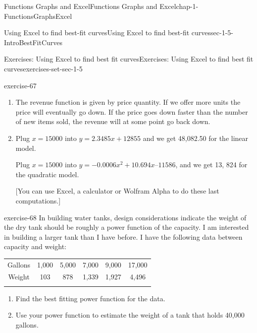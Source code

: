 \documentclass[oneside,10pt,]{book}
\numberwithin{equation}{section}
\newcommand{\hrulethin}  {\noalign{\hrule height 0.04em}}
\newcommand{\hrulemedium}{\noalign{\hrule height 0.07em}}
\newcommand{\hrulethick} {\noalign{\hrule height 0.11em}}
\begin{document}
\begin{chapterptx}{Functions Graphs and Excel}{}{Functions Graphs and Excel}{}{}{chap-1-FunctionsGraphsExcel}
\begin{sectionptx}{Using Excel to find best-fit curves}{}{Using Excel to find best-fit curves}{}{}{sec-1-5-IntroBestFitCurves}
\begin{exercises-subsection-numberless}{Exercises: Using Excel to find best fit curves}{}{Exercises: Using Excel to find best fit curves}{}{}{exercises-set-sec-1-5}
\begin{divisionexercise}{3}{}{}{exercise-67}
\begin{enumerate}[label=(\alph*)]
\par
\hypertarget{p-425}{}%
The quadratic (polynomial of degree 2) model is \(y = -0.0006x^2 + 10.694x – 11586\)%
\par
\hypertarget{p-426}{}%
The graphs show that the quadratic equation is the better model and follows the data more closely.%
\item\hypertarget{li-123}{}\hypertarget{p-427}{}%
The revenue function is given by price \textasteriskcentered{} quantity. If we offer more units the price will eventually go down. If the price goes down faster than the number of new items sold, the revenue will at some point go back down.%
\item\hypertarget{li-124}{}\hypertarget{p-428}{}%
Plug \(x = 15000\) into \(y = 2.3485x + 12855\) and we get \textdollar{}48,082.50 for the linear model.%
\par
\hypertarget{p-429}{}%
Plug \(x = 15000\) into \(y =-0.0006x^2 + 10.694x – 11586\), and we get \textdollar{}13, 824 for the quadratic model.%
\par
\hypertarget{p-430}{}%
[You can use Excel, a calculator or Wolfram Alpha to do these last computations.]%
\end{enumerate}
\end{divisionexercise}%
\begin{divisionexercise}{4}{}{}{exercise-68}%
\hypertarget{p-431}{}%
In building water tanks, design considerations indicate the weight of the dry tank should be roughly a power function of the capacity.  I am interested in building a larger tank than I have before. I have the following data between capacity and weight:%
\begin{sidebyside}{1}{0}{0}{0}%
\begin{sbspanel}{1}%
{\centering%
\begin{tabular}{cccccc}\hrulethick
Gallons&1,000&5,000&7,000&9,000&17,000\tabularnewline\hrulethin
Weight&103&878&1,339&1,927&4,496\tabularnewline\hrulemedium
\end{tabular}
\par}
\end{sbspanel}%
\end{sidebyside}%
\leavevmode%
\begin{enumerate}[label=(\alph*)]
\item\hypertarget{li-125}{}\hypertarget{p-432}{}%
Find the best fitting power function for the data.%
\item\hypertarget{li-126}{}\hypertarget{p-433}{}%
Use your power function to estimate the weight of a tank that holds 40,000 gallons.%

\end{enumerate}
\end{divisionexercise}
\end{exercises-subsection-numberless}
\end{sectionptx}
\end{chapterptx}
\end{document}
